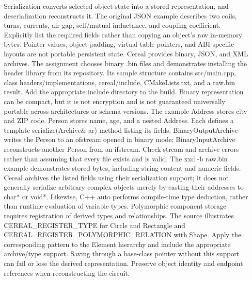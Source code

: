 \documentclass[11pt,a4paper]{article}
\begin{document}
Serialization converts selected object state into a stored representation, and deserialization reconstructs it. The original JSON example describes two coils, turns, currents, air gap, self/\allowbreak{}mutual inductance, and coupling coefficient. Explicitly list the required fields rather than copying an object's raw in-memory bytes. Pointer values, object padding, virtual-table pointers, and ABI-specific layouts are not portable persistent state. Cereal provides binary, JSON, and XML archives. The assignment chooses binary .bin files and demonstrates installing the header library from its repository. Its sample structure contains src/\allowbreak{}main.cpp, class headers/\allowbreak{}implementations, cereal/\allowbreak{}include, CMakeLists.txt, and a raw.bin result. Add the appropriate include directory to the build. Binary representation can be compact, but it is not encryption and is not guaranteed universally portable across architectures or schema versions. The example Address stores city and ZIP code. Person stores name, age, and a nested Address. Each defines a template serialize(Archive\& ar) method listing its fields. BinaryOutputArchive writes the Person to an ofstream opened in binary mode;\allowbreak{} BinaryInputArchive reconstructs another Person from an ifstream. Check stream and archive errors rather than assuming that every file exists and is valid. The xxd -b raw.bin example demonstrates stored bytes, including string content and numeric fields. Cereal archives the listed fields using their serialization support;\allowbreak{} it does not generally serialize arbitrary complex objects merely by casting their addresses to char* or void*. Likewise, C+\allowbreak{}+\allowbreak{} auto performs compile-time type deduction, rather than runtime evaluation of variable types. Polymorphic component storage requires registration of derived types and relationships. The source illustrates CEREAL\_\allowbreak{}REGISTER\_\allowbreak{}TYPE for Circle and Rectangle and CEREAL\_\allowbreak{}REGISTER\_\allowbreak{}POLYMORPHIC\_\allowbreak{}RELATION with Shape. Apply the corresponding pattern to the Element hierarchy and include the appropriate archive/\allowbreak{}type support. Saving through a base-class pointer without this support can fail or lose the derived representation. Preserve object identity and endpoint references when reconstructing the circuit.
\end{document}
